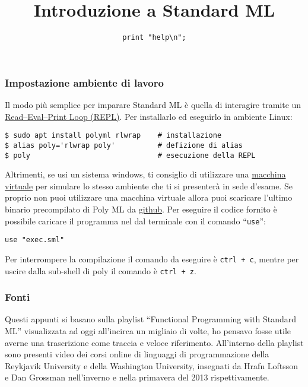 \documentclass{article}
\title{Introduzione a Standard ML}
\subtitle{\texttt{print "help\textbackslash{}n";}}
\begin{document}
\maketitle

\subsubsection*{Impostazione ambiente di lavoro}

Il modo più semplice per imparare Standard ML è quella di interagire tramite un \href{https://it.wikipedia.org/wiki/Read%E2%80%93eval%E2%80%93print_loop}{Read–Eval–Print Loop (REPL)}.
Per installarlo ed eseguirlo in ambiente Linux:

\begin{verbatim}
$ sudo apt install polyml rlwrap    # installazione
$ alias poly='rlwrap poly'          # defizione di alias
$ poly                              # esecuzione della REPL
\end{verbatim}

Altrimenti, se usi un sistema windows, ti consiglio di utilizzare una \href{https://www.virtualbox.org/}{macchina virtuale} per simulare lo stesso ambiente che ti si presenterà in sede d'esame.
Se proprio non puoi utilizzare una macchina virtuale allora puoi scaricare l'ultimo binario precompilato di Poly ML da \href{https://github.com/polyml/polyml/releases}{ github}.
Per eseguire il codice fornito è possibile caricare il programma nel dal terminale con il comando ``\texttt{use}'':
\begin{verbatim}
use "exec.sml"
\end{verbatim}
Per interrompere la compilazione il comando da eseguire è \texttt{ctrl + c}, mentre per uscire dalla sub-shell di poly il comando è \texttt{ctrl + z}.

\subsubsection*{Fonti}

Questi appunti si basano sulla playlist ``Functional Programming with Standard ML'' visualizzata ad oggi all'incirca un migliaio di volte, ho pensavo fosse utile averne una trascrizione come traccia e veloce riferimento.
All'interno della playlist sono presenti video dei corsi online di linguaggi di programmazione della Reykjavik University e della Washington University, insegnati da Hrafn Loftsson e Dan Grossman nell'inverno e nella primavera del 2013 rispettivamente.
\end{document}

